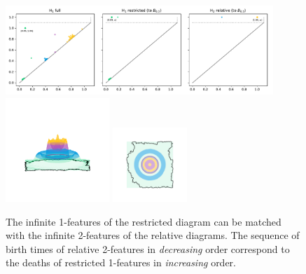 \begin{figure}[htbp]
  \centering
  \includegraphics[width=0.9\textwidth]{scripts/figures/relative/dgm-0_1.pdf}
  \includegraphics[trim=500 800 500 800, clip, width=0.35\textwidth]{scripts/figures/relative/surf_side-0_1.png}
  \includegraphics[trim=500 500 500 500, clip, width=0.25\textwidth]{scripts/figures/relative/surf_top-0_1.png}
  \caption{The infinite 1-features of the restricted diagram can be matched with the infinite 2-features of the relative diagrams.
  The sequence of birth times of relative 2-features in \emph{decreasing} order correspond to the deaths of restricted 1-features in \emph{increasing} order.}\label{fig:relative2}
\end{figure}
